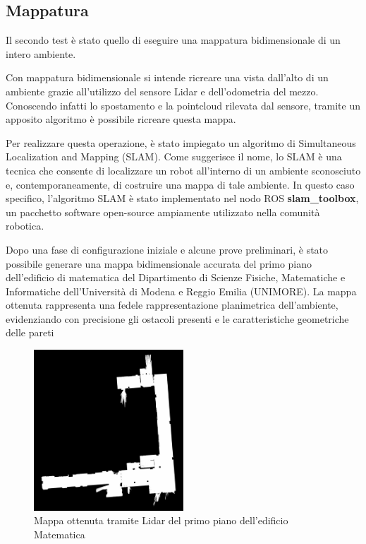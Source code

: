 \subsection{Mappatura}
Il secondo test è stato quello di eseguire una mappatura bidimensionale di un intero ambiente.

\noindent Con mappatura bidimensionale si intende ricreare una vista dall'alto di un ambiente grazie all'utilizzo del sensore Lidar e dell'odometria del mezzo. Conoscendo infatti lo spostamento e la pointcloud rilevata dal sensore, tramite un apposito algoritmo è possibile ricreare questa mappa.

\noindent Per realizzare questa operazione, è stato impiegato un algoritmo di Simultaneous Localization and Mapping (SLAM). Come suggerisce il nome, lo SLAM è una tecnica che consente di localizzare un robot all'interno di un ambiente sconosciuto e, contemporaneamente, di costruire una mappa di tale ambiente. In questo caso specifico, l'algoritmo SLAM è stato implementato nel nodo ROS \textbf{slam\_toolbox}, un pacchetto software open-source ampiamente utilizzato nella comunità robotica.

\noindent Dopo una fase di configurazione iniziale e alcune prove preliminari, è stato possibile generare una mappa bidimensionale accurata del primo piano dell'edificio di matematica del Dipartimento di Scienze Fisiche, Matematiche e Informatiche dell'Università di Modena e Reggio Emilia (UNIMORE). La mappa ottenuta rappresenta una fedele rappresentazione planimetrica dell'ambiente, evidenziando con precisione gli ostacoli presenti e le caratteristiche geometriche delle pareti

\begin{figure}[H]
  \centering
  \includegraphics[width=0.5\textwidth]{figures/franco_map.png}
  \caption{Mappa ottenuta tramite Lidar del primo piano dell'edificio Matematica}
  \label{franco_map}
\end{figure}


